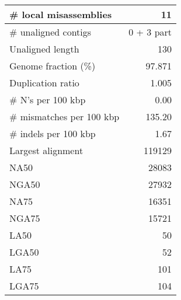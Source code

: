 \documentclass[12pt,a4paper]{article}
\begin{document}
\begin{table}[ht]
\begin{center}
\begin{tabular}{|l*{1}{|r}|}
\# local misassemblies & 11 \\ \hline
\# unaligned contigs & 0 + 3 part \\ \hline
Unaligned length & 130 \\ \hline
Genome fraction (\%) & 97.871 \\ \hline
Duplication ratio & 1.005 \\ \hline
\# N's per 100 kbp & 0.00 \\ \hline
\# mismatches per 100 kbp & 135.20 \\ \hline
\# indels per 100 kbp & 1.67 \\ \hline
Largest alignment & 119129 \\ \hline
NA50 & 28083 \\ \hline
NGA50 & 27932 \\ \hline
NA75 & 16351 \\ \hline
NGA75 & 15721 \\ \hline
LA50 & 50 \\ \hline
LGA50 & 52 \\ \hline
LA75 & 101 \\ \hline
LGA75 & 104 \\ \hline
\end{tabular}
\end{center}
\end{table}
\end{document}
